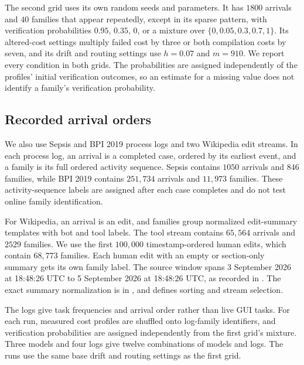 The second grid uses its own random seeds and parameters.
It has $1800$ arrivals and $40$ families that appear repeatedly, except in its sparse pattern, with verification probabilities $0.95$, $0.35$, $0$, or a mixture over $\{0,0.05,0.3,0.7,1\}$.
Its altered-cost settings multiply failed cost by three or both compilation costs by seven, and its drift and routing settings use $h=0.07$ and $m=910$.
We report every condition in both grids.
The probabilities are assigned independently of the profiles' initial verification outcomes, so an estimate for a missing value does not identify a family's verification probability.

\subsection{Recorded arrival orders}\label{app:arrival-orders}
We also use Sepsis and BPI 2019 process logs \citep{mannhardt2016sepsis,vandongen2019bpi} and two Wikipedia edit streams.
In each process log, an arrival is a completed case, ordered by its earliest event, and a family is its full ordered activity sequence.
Sepsis contains $1050$ arrivals and $846$ families, while BPI 2019 contains $251{,}734$ arrivals and $11{,}973$ families.
These activity-sequence labels are assigned after each case completes and do not test online family identification.

For Wikipedia, an arrival is an edit, and families group normalized edit-summary templates with bot and tool labels.
The tool stream contains $65{,}564$ arrivals and $2529$ families.
We use the first $100{,}000$ timestamp-ordered human edits, which contain $68{,}773$ families.
Each human edit with an empty or section-only summary gets its own family label.
The source window spans 3 September 2026 at 18:48:26 UTC to 5 September 2026 at 18:48:26 UTC, as recorded in .
The exact summary normalization is in , and  defines sorting and stream selection.

The logs give task frequencies and arrival order rather than live GUI tasks.
For each run, measured cost profiles are shuffled onto log-family identifiers, and verification probabilities are assigned independently from the first grid's mixture.
Three models and four logs give twelve combinations of models and logs.
The runs use the same base drift and routing settings as the first grid.

